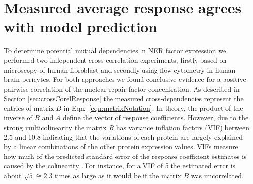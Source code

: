 \section{Measured average response agrees with model prediction}
To determine potential mutual dependencies in NER factor expression we performed two independent cross-correlation experiments, firstly based on microscopy of human fibroblast and secondly using flow cytometry in human brain pericytes. For both approaches we found conclusive evidence for a positive pairwise correlation of the nuclear repair factor concentration. As described in Section \ref{sec:crossCorelResponse} the measured cross-dependencies represent the entries of matrix $B$ in Eqn.\ \ref{eqn:matrixNotation}. In theory, the product of the inverse of $B$ and $A$ define the vector of response coefficients. However, due to the strong multicolinearity the matrix $B$ has variance inflation factors (VIF) between 2.5 and 10.8 indicating that the variations of each protein are largely explained by a linear combinations of the other protein expression values. VIFs measure how much of the predicted standard error of the response coefficient estimates is caused by the colinearity \cite{Allison1999}. For instance, for a VIF of 5 the estimated error is  about $\sqrt{5} \cong 2.3$ times as large as it would be if the matrix $B$ was uncorrelated.\\ 
